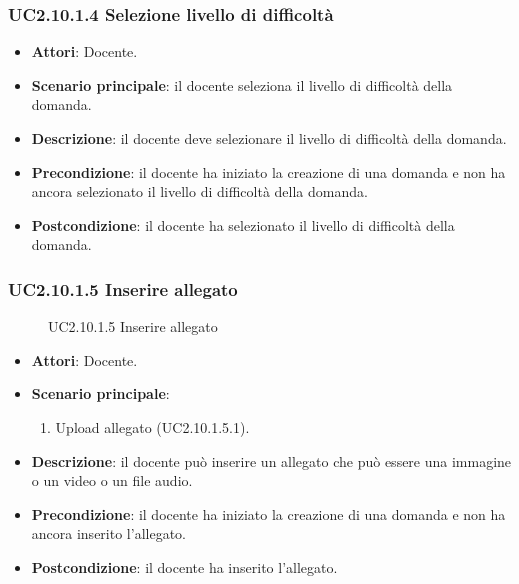 \subsubsection{UC2.10.1.4 Selezione livello di difficoltà}
\begin{itemize}
\item \textbf{Attori}: Docente.
\item \textbf{Scenario principale}: il docente seleziona il livello di difficoltà della domanda.
\item \textbf{Descrizione}: il docente deve selezionare il livello di difficoltà della domanda.
\item \textbf{Precondizione}: il docente ha iniziato la creazione di una domanda e non ha ancora selezionato il livello di difficoltà della domanda.
\item \textbf{Postcondizione}: il docente ha selezionato il livello di difficoltà della domanda.
\end{itemize}
\subsubsection{UC2.10.1.5 Inserire allegato}
\begin{figure}[H]
\centering
\noindent{}
\caption{UC2.10.1.5 Inserire allegato}
\end{figure}
\begin{itemize}
\item \textbf{Attori}: Docente.
\item \textbf{Scenario principale}:
\begin{enumerate}
\item Upload allegato (UC2.10.1.5.1).
\end{enumerate}
\item \textbf{Descrizione}: il docente può inserire un allegato che può essere una immagine o un video o un file audio.
\item \textbf{Precondizione}: il docente ha iniziato la creazione di una domanda e non ha ancora inserito l'allegato.
\item \textbf{Postcondizione}: il docente ha inserito l'allegato.
\end{itemize}
